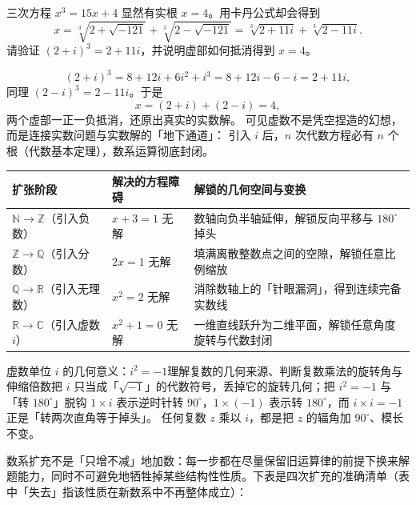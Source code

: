 \begin{explore}
\begin{example}
三次方程 $x^3=15x+4$ 显然有实根 $x=4$。用卡丹公式却会得到
\[
  x=\sqrt[3]{2+\sqrt{-121}}+\sqrt[3]{2-\sqrt{-121}}
  =\sqrt[3]{2+11i}+\sqrt[3]{2-11i}.
\]
请验证 $(2+i)^3=2+11i$，并说明虚部如何抵消得到 $x=4$。
\end{example}
\begin{solution}
\[
  (2+i)^3=8+12i+6i^2+i^3=8+12i-6-i=2+11i,
\]
同理 $(2-i)^3=2-11i$。于是
\[
  x=(2+i)+(2-i)=4,
\]
两个虚部一正一负抵消，还原出真实的实数解。
可见虚数不是凭空捏造的幻想，而是连接实数问题与实数解的「地下通道」：
引入 $i$ 后，$n$ 次代数方程必有 $n$ 个根（代数基本定理），数系运算彻底封闭。
\end{solution}

\begin{center}
\footnotesize
\setlength{\tabcolsep}{3pt}
\renewcommand{\arraystretch}{1.4}
\begin{tabular}{p{2.8cm}p{3.4cm}p{5.4cm}}
\toprule
扩张阶段 & 解决的方程障碍 & 解锁的几何空间与变换 \\
\midrule
$\mathbb{N}\to\mathbb{Z}$（引入负数） & $x+3=1$ 无解 & 数轴向负半轴延伸，解锁反向平移与 $180^\circ$ 掉头 \\
$\mathbb{Z}\to\mathbb{Q}$（引入分数） & $2x=1$ 无解 & 填满离散整数点之间的空隙，解锁任意比例缩放 \\
$\mathbb{Q}\to\mathbb{R}$（引入无理数） & $x^2=2$ 无解 & 消除数轴上的「针眼漏洞」，得到连续完备实数线 \\
$\mathbb{R}\to\mathbb{C}$（引入虚数 $i$） & $x^2+1=0$ 无解 & 一维直线跃升为二维平面，解锁任意角度旋转与代数封闭 \\
\bottomrule
\end{tabular}
\end{center}

\begin{conccard}[一级]{虚数单位 $i$ 的几何意义：$i^2=-1$}{理解复数的几何来源、判断复数乘法的旋转角与伸缩倍数}{把 $i$ 只当成「$\sqrt{-1}$」的代数符号，丢掉它的旋转几何；把 $i^2=-1$ 与「转 $180^\circ$」脱钩}
$1\times i$ 表示逆时针转 $90^\circ$，$1\times(-1)$ 表示转 $180^\circ$，而 $i\times i=-1$ 正是「转两次直角等于掉头」。
任何复数 $z$ 乘以 $i$，都是把 $z$ 的辐角加 $90^\circ$、模长不变。
\end{conccard}

数系扩充不是「只增不减」地加数：每一步都在尽量保留旧运算律的前提下换来解题能力，同时不可避免地牺牲掉某些结构性性质。下表是四次扩充的准确清单（表中「失去」指该性质在新数系中不再整体成立）：


\end{explore}

